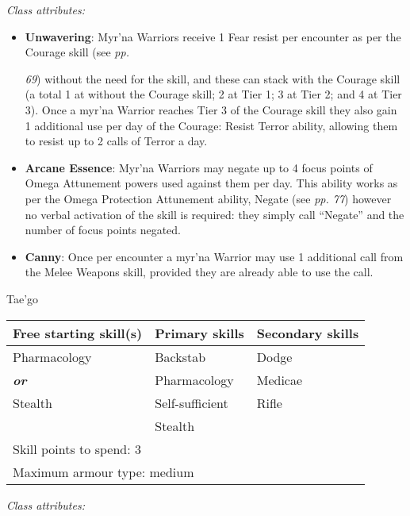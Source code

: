 \documentclass{scrbook}
\begin{document}
\textit{Class attributes:}

\begin{itemize}
\item \textbf{Unwavering}: Myr'na Warriors receive 1 Fear resist per encounter as per the Courage skill (see \textit{pp.}

\textit{69}) without the need for the skill, and these can stack with the Courage skill (a total 1 at without the Courage skill; 2 at Tier 1; 3 at Tier 2; and 4 at Tier 3). Once a myr'na Warrior reaches Tier 3 of the Courage skill they also gain 1 additional use per day of the Courage: Resist Terror ability, allowing them to resist up to 2 calls of Terror a day.

\item \textbf{Arcane Essence}: Myr'na Warriors may negate up to 4 focus points of Omega Attunement powers used against them per day. This ability works as per the Omega Protection Attunement ability, Negate (see \textit{pp. 77}) however no verbal activation of the skill is required: they simply call ``Negate'' and the number of focus points negated.

\item \textbf{Canny}: Once per encounter a myr'na Warrior may use 1 additional call from the Melee Weapons skill, provided they are already able to use the call.

\end{itemize}
Tae'go

\begin{table}
\begin{tabular}{|l|l|l|} \hline 
Free starting skill(s) & Primary skills & Secondary skills \\
 \hline Pharmacology & Backstab & Dodge \\
 \hline \textbf{\textit{or}} & Pharmacology & Medicae \\
 \hline Stealth & Self-sufficient & Rifle \\
 \hline  & Stealth &  \\
 \hline \multicolumn{3}{|l|}{Skill points to spend: 3} \\
 \hline \multicolumn{3}{|l|}{Maximum armour type: medium} \\
 \hline \end{tabular}

\end{table}

\textit{Class attributes:}
\end{document}
